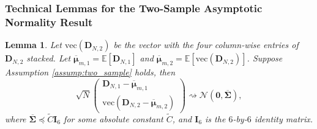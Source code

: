 \documentclass[12pt,letterpaper]{article}
\newtheorem{lemma}{Lemma}[section]
\begin{document}
\subsubsection{Technical Lemmas for the Two-Sample Asymptotic Normality Result}
\begin{lemma}\label{lemma:CLT:two-sample} Let $\mathrm{vec}(\mathbf{D}_{N,2})$ be the vector with the four column-wise entries of $\mathbf{D}_{N,2}$ stacked. Let $\overline{\boldsymbol{\mu}}_{m,1}=\mathbb{E}[\mathbf{D}_{N,1}]$ and $\overline{\boldsymbol{\mu}}_{m,2}=\mathbb{E}[\mathrm{vec}(\mathbf{D}_{N,2})]$. Suppose Assumption \ref{assump:two_sample} holds, then 
\begin{equation}\label{eq:CLT:main:two-sample}
\sqrt{N}\begin{pmatrix}
\mathbf{D}_{N,1}-\overline{\boldsymbol{\mu}}_{m,1}\\
\mathrm{vec}(\mathbf{D}_{N,2}-\overline{\boldsymbol{\mu}}_{m,2})
\end{pmatrix}\rightsquigarrow\mathcal{N}\left(\mathbf{0},\overline{\boldsymbol{\Sigma}}\right),
\end{equation}
where $\overline{\boldsymbol{\Sigma}}\preceq\tilde{C}\mathbf{I}_6$ for some absolute constant $\tilde{C}$, and $\mathbf{I}_6$ is the $6$-by-$6$ identity matrix.
\end{lemma}
\end{document}
